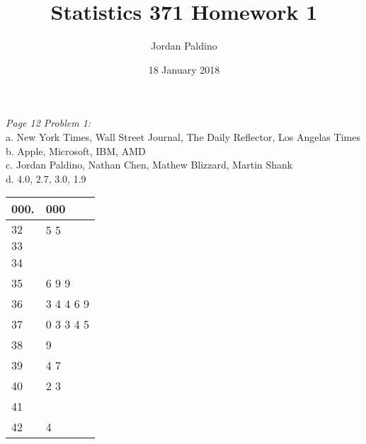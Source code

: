 \documentclass{article}
\title{Statistics 371 Homework 1}
\author{Jordan Paldino}
\date{18 January 2018}
\begin{document}
\maketitle
\textit{Page 12 Problem 1:} \\
a. New York Times, Wall Street Journal, The Daily Reflector, Los Angelas Times \\
b. Apple, Microsoft, IBM, AMD \\
c. Jordan Paldino, Nathan Chen, Mathew Blizzard, Martin Shank \\
d. 4.0, 2.7, 3.0, 1.9 \\

\begin{tabular}{l|l }
\textbf{00}0. & 00\textbf{0} \\ \hline
$32$ & 5 5\\
$33$ & \\
34 & \\
35 & 6 9 9 \\
36 & 3 4 4 6 9 \\
37 & 0 3 3 4 5 \\
38 & 9 \\
39 & 4 7 \\
40 & 2 3 \\
41 &  \\
42 & 4\\ 
\end{tabular}
\end{document}
